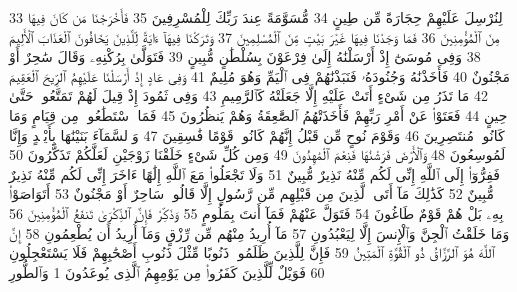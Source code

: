 {\tiny\colorbox{cl_aya}{33}} لِنُرْسِلَ عَلَيْهِمْ حِجَارَةً مِّن طِينٍ
{\tiny\colorbox{cl_aya}{34}} مُّسَوَّمَةً عِندَ رَبِّكَ لِلْمُسْرِفِينَ
{\tiny\colorbox{cl_aya}{35}} فَأَخْرَجْنَا مَن كَانَ فِيهَا مِنَ ٱلْمُؤْمِنِينَ
{\tiny\colorbox{cl_aya}{36}} فَمَا وَجَدْنَا فِيهَا غَيْرَ بَيْتٍ مِّنَ ٱلْمُسْلِمِينَ
{\tiny\colorbox{cl_aya}{37}} وَتَرَكْنَا فِيهَآ ءَايَةً لِّلَّذِينَ يَخَافُونَ ٱلْعَذَابَ ٱلْأَلِيمَ
{\tiny\colorbox{cl_aya}{38}} وَفِى مُوسَىٰٓ إِذْ أَرْسَلْنَٰهُ إِلَىٰ فِرْعَوْنَ بِسُلْطَٰنٍ مُّبِينٍ
{\tiny\colorbox{cl_aya}{39}} فَتَوَلَّىٰ بِرُكْنِهِۦ وَقَالَ سَٰحِرٌ أَوْ مَجْنُونٌ
{\tiny\colorbox{cl_aya}{40}} فَأَخَذْنَٰهُ وَجُنُودَهُۥ فَنَبَذْنَٰهُمْ فِى ٱلْيَمِّ وَهُوَ مُلِيمٌ
{\tiny\colorbox{cl_aya}{41}} وَفِى عَادٍ إِذْ أَرْسَلْنَا عَلَيْهِمُ ٱلرِّيحَ ٱلْعَقِيمَ
{\tiny\colorbox{cl_aya}{42}} مَا تَذَرُ مِن شَىْءٍ أَتَتْ عَلَيْهِ إِلَّا جَعَلَتْهُ كَٱلرَّمِيمِ
{\tiny\colorbox{cl_aya}{43}} وَفِى ثَمُودَ إِذْ قِيلَ لَهُمْ تَمَتَّعُوا۟ حَتَّىٰ حِينٍ
{\tiny\colorbox{cl_aya}{44}} فَعَتَوْا۟ عَنْ أَمْرِ رَبِّهِمْ فَأَخَذَتْهُمُ ٱلصَّٰعِقَةُ وَهُمْ يَنظُرُونَ
{\tiny\colorbox{cl_aya}{45}} فَمَا ٱسْتَطَٰعُوا۟ مِن قِيَامٍ وَمَا كَانُوا۟ مُنتَصِرِينَ
{\tiny\colorbox{cl_aya}{46}} وَقَوْمَ نُوحٍ مِّن قَبْلُ إِنَّهُمْ كَانُوا۟ قَوْمًا فَٰسِقِينَ
{\tiny\colorbox{cl_aya}{47}} وَٱلسَّمَآءَ بَنَيْنَٰهَا بِأَيْي۟دٍ وَإِنَّا لَمُوسِعُونَ
{\tiny\colorbox{cl_aya}{48}} وَٱلْأَرْضَ فَرَشْنَٰهَا فَنِعْمَ ٱلْمَٰهِدُونَ
{\tiny\colorbox{cl_aya}{49}} وَمِن كُلِّ شَىْءٍ خَلَقْنَا زَوْجَيْنِ لَعَلَّكُمْ تَذَكَّرُونَ
{\tiny\colorbox{cl_aya}{50}} فَفِرُّوٓا۟ إِلَى ٱللَّهِ إِنِّى لَكُم مِّنْهُ نَذِيرٌ مُّبِينٌ
{\tiny\colorbox{cl_aya}{51}} وَلَا تَجْعَلُوا۟ مَعَ ٱللَّهِ إِلَٰهًا ءَاخَرَ إِنِّى لَكُم مِّنْهُ نَذِيرٌ مُّبِينٌ
{\tiny\colorbox{cl_aya}{52}} كَذَٰلِكَ مَآ أَتَى ٱلَّذِينَ مِن قَبْلِهِم مِّن رَّسُولٍ إِلَّا قَالُوا۟ سَاحِرٌ أَوْ مَجْنُونٌ
{\tiny\colorbox{cl_aya}{53}} أَتَوَاصَوْا۟ بِهِۦ بَلْ هُمْ قَوْمٌ طَاغُونَ
{\tiny\colorbox{cl_aya}{54}} فَتَوَلَّ عَنْهُمْ فَمَآ أَنتَ بِمَلُومٍ
{\tiny\colorbox{cl_aya}{55}} وَذَكِّرْ فَإِنَّ ٱلذِّكْرَىٰ تَنفَعُ ٱلْمُؤْمِنِينَ
{\tiny\colorbox{cl_aya}{56}} وَمَا خَلَقْتُ ٱلْجِنَّ وَٱلْإِنسَ إِلَّا لِيَعْبُدُونِ
{\tiny\colorbox{cl_aya}{57}} مَآ أُرِيدُ مِنْهُم مِّن رِّزْقٍ وَمَآ أُرِيدُ أَن يُطْعِمُونِ
{\tiny\colorbox{cl_aya}{58}} إِنَّ ٱللَّهَ هُوَ ٱلرَّزَّاقُ ذُو ٱلْقُوَّةِ ٱلْمَتِينُ
{\tiny\colorbox{cl_aya}{59}} فَإِنَّ لِلَّذِينَ ظَلَمُوا۟ ذَنُوبًا مِّثْلَ ذَنُوبِ أَصْحَٰبِهِمْ فَلَا يَسْتَعْجِلُونِ
{\tiny\colorbox{cl_aya}{60}} فَوَيْلٌ لِّلَّذِينَ كَفَرُوا۟ مِن يَوْمِهِمُ ٱلَّذِى يُوعَدُونَ
{\tiny\colorbox{cl_aya}{1}} وَٱلطُّورِ
